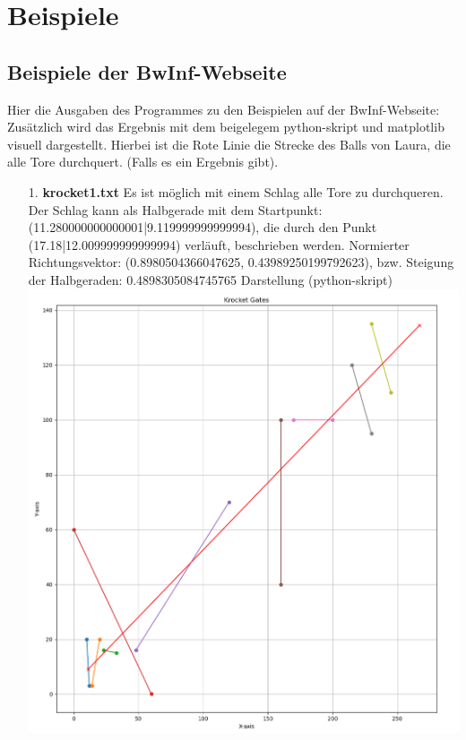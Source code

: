 \documentclass[a4paper,10pt,ngerman]{scrartcl}
\begin{document}
\section{Beispiele}
\subsection{Beispiele der BwInf-Webseite}
Hier die Ausgaben des Programmes zu den Beispielen auf der BwInf-Webseite: Zusätzlich wird das Ergebnis mit dem beigelegem python-skript und matplotlib visuell dargestellt. Hierbei ist die
Rote Linie die Strecke des Balls von Laura, die alle Tore durchquert. (Falls es ein Ergebnis gibt).
\begin{itemize}
  \item [1.] \textbf{krocket1.txt}
    \newline
    Es ist möglich mit einem Schlag alle Tore zu durchqueren.
    \newline
    Der Schlag kann als Halbgerade mit dem Startpunkt: (11.280000000000001|9.119999999999994), die durch den Punkt (17.18|12.009999999999994) verläuft, beschrieben werden.
    \newline
    Normierter Richtungsvektor: (0.8980504366047625, 0.43989250199792623), bzw. Steigung der Halbgeraden: 0.4898305084745765
    \newline
    \newline
    Darstellung (python-skript)
    \newline
    \includegraphics[scale=0.27]{krocket1.png}


\end{itemize}
\end{document}
